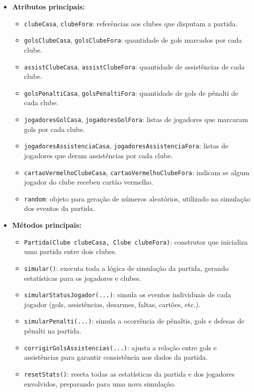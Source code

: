 \documentclass[12pt]{article}
\begin{document}
\begin{itemize}
  \item \textbf{Atributos principais:}
        \begin{itemize}
          \item \texttt{clubeCasa}, \texttt{clubeFora}: referências aos clubes que disputam a partida.
          \item \texttt{golsClubeCasa}, \texttt{golsClubeFora}: quantidade de gols marcados por cada clube.
          \item \texttt{assistClubeCasa}, \texttt{assistClubeFora}: quantidade de assistências de cada clube.
          \item \texttt{golsPenaltiCasa}, \texttt{golsPenaltiFora}: quantidade de gols de pênalti de cada clube.
          \item \texttt{jogadoresGolCasa}, \texttt{jogadoresGolFora}: listas de jogadores que marcaram gols por cada clube.
          \item \texttt{jogadoresAssistenciaCasa}, \texttt{jogadoresAssistenciaFora}: listas de jogadores que deram assistências por cada clube.
          \item \texttt{cartaoVermelhoClubeCasa}, \texttt{cartaoVermelhoClubeFora}: indicam se algum jogador do clube recebeu cartão vermelho.
          \item \texttt{random}: objeto para geração de números aleatórios, utilizado na simulação dos eventos da partida.
        \end{itemize}
  \item \textbf{Métodos principais:}
        \begin{itemize}
          \item \texttt{Partida(Clube clubeCasa, Clube clubeFora)}: construtor que inicializa uma partida entre dois clubes.
          \item \texttt{simular()}: executa toda a lógica de simulação da partida, gerando estatísticas para os jogadores e clubes.
          \item \texttt{simularStatusJogador(...)}: simula os eventos individuais de cada jogador (gols, assistências, desarmes, faltas, cartões, etc.).
          \item \texttt{simularPenalti(...)}: simula a ocorrência de pênaltis, gols e defesas de pênalti na partida.
          \item \texttt{corrigirGolsAssistencias(...)}: ajusta a relação entre gols e assistências para garantir consistência nos dados da partida.
          \item \texttt{resetStats()}: reseta todas as estatísticas da partida e dos jogadores envolvidos, preparando para uma nova simulação.

\end{itemize}
\end{itemize}
\end{document}
